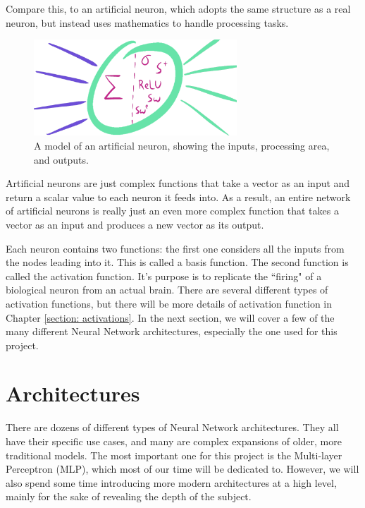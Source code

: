 \documentclass[12pt]{report}
\begin{document}
Compare this, to an artificial neuron, which adopts the same structure as a real neuron, but instead uses mathematics to handle processing tasks.
\begin{figure}[hbt!]
    \centering
    \includegraphics[width=3in]{figures/neuron.PNG}
    \caption{A model of an  artificial neuron, showing the inputs, processing area, and outputs.}
    \label{neuron}
\end{figure}
Artificial neurons are just complex functions that take a vector as an input and return a scalar value to each neuron it feeds into. As a result, an entire network of artificial neurons is really just an even more complex function that takes a vector as an input and produces a new vector as its output.

Each neuron contains two functions: the first one considers all the inputs from the nodes leading into it. This is called a basis function. The second function is called the activation function. It's purpose is to replicate the ``firing" of a biological neuron from an actual brain. There are several different types of activation functions, but there will be more details of activation function in Chapter \ref{section: activations}. In the next section, we will cover a few of the many different Neural Network architectures, especially the one used for this project.

\section{Architectures}
There are dozens of different types of Neural Network architectures. They all have their specific use cases, and many are complex expansions of older, more traditional models. The most important one for this project is the Multi-layer Perceptron (MLP), which most of our time will be dedicated to. However, we will also spend some time introducing more modern architectures at a high level, mainly for the sake of revealing the depth of the subject.
\end{document}
